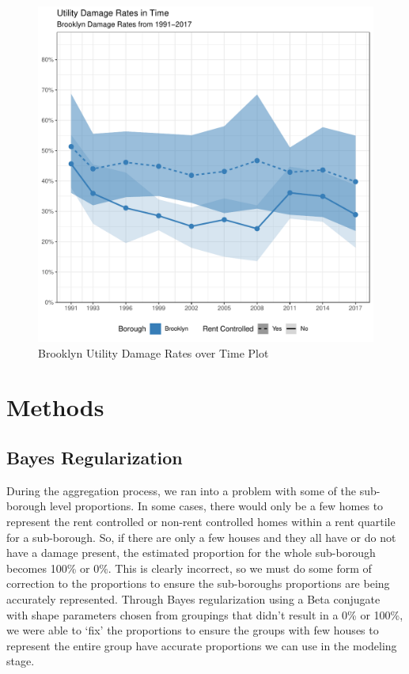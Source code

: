 \documentclass[11pt]{asaproc}\usepackage[]{graphicx}\usepackage[]{color}
\makeatletter
\def\maxwidth{ %
  \ifdim\Gin@nat@width>\linewidth
    \linewidth
  \else
    \Gin@nat@width
  \fi
}
\newenvironment{knitrout}{}{} %
\makeatother
\begin{document}
\begin{figure}
\begin{center}
\begin{knitrout}
\color{fgcolor}
\includegraphics[width=\maxwidth]{figure/fig2-1} 

\end{knitrout}
\end{center}
\caption{Brooklyn Utility Damage Rates over Time Plot}
\label{fig:two}
\end{figure}
 
\section{Methods\label{methods}}
\subsection{Bayes Regularization}



During the aggregation process, we ran into a problem with some of the sub-borough level proportions. In some cases, there would only be a few homes to represent the rent controlled or non-rent controlled homes within a rent quartile for a sub-borough. So, if there are only a few houses and they all have or do not have a damage present, the estimated proportion for the whole sub-borough becomes 100\% or 0\%. This is clearly incorrect, so we must do some form of correction to the proportions to ensure the sub-boroughs proportions are being accurately represented. Through Bayes regularization using a Beta conjugate with shape parameters chosen from groupings that didn’t result in a 0\% or 100\%, we were able to ‘fix’ the proportions to ensure the groups with few houses to represent the entire group have accurate proportions we can use in the modeling stage. 
\end{document}
